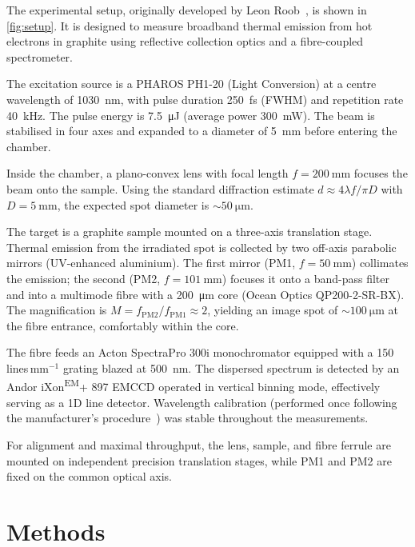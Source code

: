 \documentclass[
	parskip=half,
	a4paper,
]{scrarticle}
\begin{document}
The experimental setup, originally developed by Leon Roob~\cite{roob_thermal_2025}, is shown in \autoref{fig:setup}. It is designed to measure broadband thermal emission from hot electrons in graphite using reflective collection optics and a fibre-coupled spectrometer.

The excitation source is a PHAROS PH1-20 (Light Conversion) at a centre wavelength of \SI{1030}{\nano\metre}, with pulse duration \SI{250}{\femto\second} (FWHM) and repetition rate \SI{40}{\kilo\hertz}. The pulse energy is \SI{7.5}{\micro\joule} (average power \SI{300}{\milli\watt}). The beam is stabilised in four axes and expanded to a diameter of \SI{5}{\milli\metre} before entering the chamber.

Inside the chamber, a plano-convex lens with focal length \(f=\SI{200}{\milli\metre}\) focuses the beam onto the sample. Using the standard diffraction estimate \(d \approx 4\lambda f / \pi D\) with \(D=\SI{5}{\milli\metre}\), the expected spot diameter is \(\sim\SI{50}{\micro\metre}\).

The target is a graphite sample mounted on a three-axis translation stage. Thermal emission from the irradiated spot is collected by two off-axis parabolic mirrors (UV-enhanced aluminium). The first mirror (PM1, \(f=\SI{50}{\milli\metre}\)) collimates the emission; the second (PM2, \(f=\SI{101}{\milli\metre}\)) focuses it onto a band-pass filter and into a multimode fibre with a \SI{200}{\micro\metre} core (Ocean Optics QP200-2-SR-BX). The magnification is \(M = f_{\mathrm{PM2}}/f_{\mathrm{PM1}} \approx 2\), yielding an image spot of \(\sim\SI{100}{\micro\metre}\) at the fibre entrance, comfortably within the core.

The fibre feeds an Acton SpectraPro 300i monochromator equipped with a 150\,lines\,mm\(^{-1}\) grating blazed at \SI{500}{\nano\metre}. The dispersed spectrum is detected by an Andor iXon\textsuperscript{EM}+ 897 EMCCD operated in vertical binning mode, effectively serving as a 1D line detector.
Wavelength calibration (performed once following the manufacturer’s procedure~\cite{roob_thermal_2025}) was stable throughout the measurements.

For alignment and maximal throughput, the lens, sample, and fibre ferrule are mounted on independent precision translation stages, while PM1 and PM2 are fixed on the common optical axis. 

\section{Methods}
\end{document}
